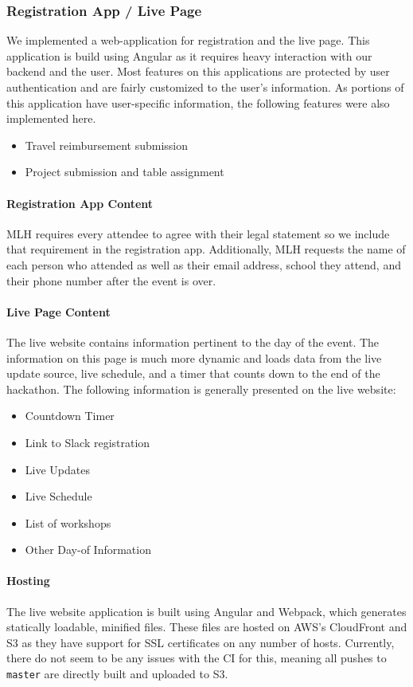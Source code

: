 \documentclass[twoside, 12pt]{article}
\newenvironment{tightitemize} %
{\begin{itemize}\itemsep1pt \parskip0pt \parsep0pt}
{\end{itemize}\vspace{-\topsep}}
\begin{document}
\subsubsection{Registration App / Live Page}
\par We implemented a web-application for registration and the live page. This application is build using Angular \cite{angular_docs} as it requires heavy interaction with our backend and the user. Most features on this applications are protected by user authentication and are fairly customized to the user's information. As portions of this application have user-specific information, the following features were also implemented here.
\begin{tightitemize}
    \item Travel reimbursement submission
    \item Project submission and table assignment
\end{tightitemize}
\paragraph{Registration App Content} 
\par MLH requires every attendee to agree with their legal statement so we include that requirement in the registration app.  Additionally, MLH requests the name of each person who attended as well as their email address, school they attend, and their phone number after the event is over.  
\paragraph{Live Page Content} 
\par The live website contains information pertinent to the day of the event. The information on this page is much more dynamic and loads data from the live update source, live schedule, and a timer that counts down to the end of the hackathon. The following information is generally presented on the live website:
\begin{tightitemize}
    \item Countdown Timer
    \item Link to Slack registration
    \item Live Updates
    \item Live Schedule
    \item List of workshops
    \item Other Day-of Information
\end{tightitemize}
\paragraph{Hosting}
\par The live website application is built using Angular and Webpack, which generates statically loadable, minified files. These files are hosted on AWS's CloudFront and \cite{amazon_cloudfront} S3 as they have support for SSL certificates on any number of hosts. Currently, there do not seem to be any issues with the CI for this, meaning all pushes to \texttt{master} are directly built and uploaded to S3.
\end{document}
